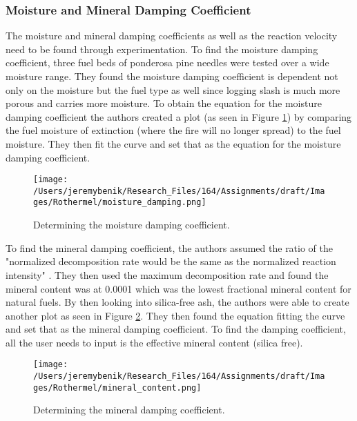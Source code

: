 \documentclass{article}
\begin{document}
 \subsubsection{Moisture and Mineral Damping Coefficient}
\indent The moisture and mineral damping coefficients as well as the reaction velocity need to be found through experimentation. To find the moisture damping coefficient, three fuel beds of ponderosa pine needles were tested over a wide moisture range. They found the moisture damping coefficient is dependent not only on the moisture but the fuel type as well since logging slash is much more porous and carries more moisture. To obtain the equation for the moisture damping coefficient the authors created a plot (as seen in Figure \ref{rothermel_moistures_damping}) by comparing the fuel moisture of extinction (where the fire will no longer spread) to the fuel moisture. They then fit the curve and set that as the equation for the moisture damping coefficient. 
 \begin{figure}[h]
 \centering
  \texttt{[image: /Users/jeremybenik/Research\_Files/164/Assignments/draft/Images/Rothermel/moisture\_damping.png]}
  \caption{Determining the moisture damping coefficient.}
  \label{rothermel_moistures_damping}
\end{figure}

 \indent To find the mineral damping coefficient, the authors assumed the ratio of the "normalized decomposition rate would be the same as the normalized reaction intensity" \citep{Rothermel1972}. They then used the maximum decomposition rate and found the mineral content was at 0.0001 which was the lowest fractional mineral content for natural fuels. By then looking into silica-free ash, the authors were able to create another plot as seen in Figure \ref{rothermel_mineral_damping_coef}. They then found the equation fitting the curve and set that as the mineral damping coefficient. To find the damping coefficient, all the user needs to input is the effective mineral content (silica free). \\
 \begin{figure}[h]
 \centering
  \texttt{[image: /Users/jeremybenik/Research\_Files/164/Assignments/draft/Images/Rothermel/mineral\_content.png]}
  \caption{Determining the mineral damping coefficient.}
  \label{rothermel_mineral_damping_coef}
\end{figure}
\end{document}
